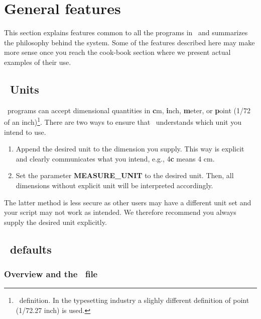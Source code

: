 %
%
\chapter{General features}
\thispagestyle{headings}

This section explains features common to all the programs
in \GMT\ and summarizes the philosophy behind the system.  Some
of the features described here may make more sense once you reach
the cook-book section where we present actual examples of their use. 

\section{\gmt\ Units}

\GMT\ programs can accept dimensional quantities in {\bf c}m, {\bf i}nch,
{\bf m}eter, or {\bf p}oint (1/72 of an inch)\footnote{\PS\ definition.
In the typesetting industry a slighly different definition of point
(1/72.27 inch) is used.}.  There are two ways to ensure that \GMT\ understands
which unit you intend to use.

\begin{enumerate}
\item Append the desired unit to the dimension you supply.  This
way is explicit and clearly communicates what you intend, e.g.,
4{\bf c} means 4 cm.

\item Set the parameter {\bf MEASURE\_UNIT} to the desired unit.  Then, all
dimensions without explicit unit will be interpreted accordingly.

\end{enumerate}

The latter method is less secure as other users may have a different unit
set and your script may not work as intended.  We therefore recommend
you always supply the desired unit explicitly.

\section{\gmt\ defaults}
\subsection{Overview and the \ file}


